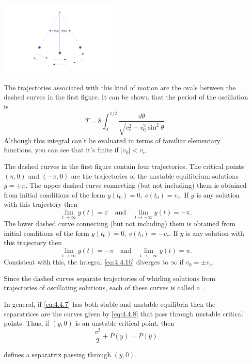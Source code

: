 \documentclass{ximera}
\begin{document}
\begin{example}
\begin{image}
 \includegraphics[height=1.5in]{fig040409.jpg}
\end{image}
 
 
The
trajectories associated with this kind of motion are the ovals between
the dashed curves in the first figure. It can be shown %
that the period of the
oscillation is
\begin{equation} \label{eq:4.4.16}
T=8\int_0^{\pi/2}\frac{d\theta}{\sqrt{v_c^2-v_0^2\sin^2\theta}}.
\end{equation}
Although this integral can't be evaluated in terms of familiar
elementary functions, you can see that it's finite if $|v_0|<v_c$.
 
The dashed curves in the first figure contain four
trajectories. The critical points $(\pi,0)$ and $(-\pi,0)$ are the
trajectories of the unstable equilibrium solutions $\overline
y=\pm\pi$.
The upper dashed curve connecting (but not including) them is obtained
from initial conditions of the form $y(t_0)=0,\ v(t_0)=v_c$. If $y$ is
any solution with this trajectory then
$$
\lim_{t\rightarrow\infty}y(t)=\pi\quad\mbox{and}\quad\lim_{t\rightarrow-\infty}y(t)=-\pi.
$$
The lower dashed curve connecting (but not including) them is obtained
from initial conditions of the form $y(t_0)=0,\ v(t_0)=-v_c$. If $y$
is any solution with this trajectory then
$$
\lim_{t\rightarrow\infty}y(t)=-\pi\quad\mbox{and}\quad\lim_{t\rightarrow-\infty}y(t)=\pi.
$$
Consistent with this, the integral \eqref{eq:4.4.16} diverges to $\infty$
if $v_0=\pm v_c$. %
 
Since the dashed curves separate trajectories of whirling solutions
from trajectories of oscillating solutions, each of these curves is
called a .
 
In general, if \eqref{eq:4.4.7} has both stable and unstable equilibria
then the separatrices are the curves given by \eqref{eq:4.4.8} that pass
through unstable critical points. Thus, if $(\overline{y},0)$ is an
unstable critical point, then
\begin{equation} \label{eq:4.4.17}
\frac{v^2}{2}+P(y)=P(\overline{y})
\end{equation}
 
defines a separatrix passing through $(\overline{y},0)$.
\end{example}
 
\end{document}

